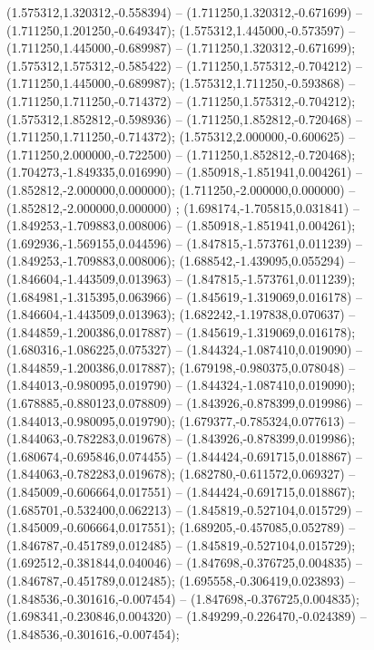  (1.575312,1.320312,-0.558394) -- (1.711250,1.320312,-0.671699) -- (1.711250,1.201250,-0.649347);
 (1.575312,1.445000,-0.573597) -- (1.711250,1.445000,-0.689987) -- (1.711250,1.320312,-0.671699);
 (1.575312,1.575312,-0.585422) -- (1.711250,1.575312,-0.704212) -- (1.711250,1.445000,-0.689987);
 (1.575312,1.711250,-0.593868) -- (1.711250,1.711250,-0.714372) -- (1.711250,1.575312,-0.704212);
 (1.575312,1.852812,-0.598936) -- (1.711250,1.852812,-0.720468) -- (1.711250,1.711250,-0.714372);
 (1.575312,2.000000,-0.600625) -- (1.711250,2.000000,-0.722500) -- (1.711250,1.852812,-0.720468);
 (1.704273,-1.849335,0.016990) -- (1.850918,-1.851941,0.004261) -- (1.852812,-2.000000,0.000000);
 (1.711250,-2.000000,0.000000) -- (1.852812,-2.000000,0.000000) ;
 (1.698174,-1.705815,0.031841) -- (1.849253,-1.709883,0.008006) -- (1.850918,-1.851941,0.004261);
 (1.692936,-1.569155,0.044596) -- (1.847815,-1.573761,0.011239) -- (1.849253,-1.709883,0.008006);
 (1.688542,-1.439095,0.055294) -- (1.846604,-1.443509,0.013963) -- (1.847815,-1.573761,0.011239);
 (1.684981,-1.315395,0.063966) -- (1.845619,-1.319069,0.016178) -- (1.846604,-1.443509,0.013963);
 (1.682242,-1.197838,0.070637) -- (1.844859,-1.200386,0.017887) -- (1.845619,-1.319069,0.016178);
 (1.680316,-1.086225,0.075327) -- (1.844324,-1.087410,0.019090) -- (1.844859,-1.200386,0.017887);
 (1.679198,-0.980375,0.078048) -- (1.844013,-0.980095,0.019790) -- (1.844324,-1.087410,0.019090);
 (1.678885,-0.880123,0.078809) -- (1.843926,-0.878399,0.019986) -- (1.844013,-0.980095,0.019790);
 (1.679377,-0.785324,0.077613) -- (1.844063,-0.782283,0.019678) -- (1.843926,-0.878399,0.019986);
 (1.680674,-0.695846,0.074455) -- (1.844424,-0.691715,0.018867) -- (1.844063,-0.782283,0.019678);
 (1.682780,-0.611572,0.069327) -- (1.845009,-0.606664,0.017551) -- (1.844424,-0.691715,0.018867);
 (1.685701,-0.532400,0.062213) -- (1.845819,-0.527104,0.015729) -- (1.845009,-0.606664,0.017551);
 (1.689205,-0.457085,0.052789) -- (1.846787,-0.451789,0.012485) -- (1.845819,-0.527104,0.015729);
 (1.692512,-0.381844,0.040046) -- (1.847698,-0.376725,0.004835) -- (1.846787,-0.451789,0.012485);
 (1.695558,-0.306419,0.023893) -- (1.848536,-0.301616,-0.007454) -- (1.847698,-0.376725,0.004835);
 (1.698341,-0.230846,0.004320) -- (1.849299,-0.226470,-0.024389) -- (1.848536,-0.301616,-0.007454);
